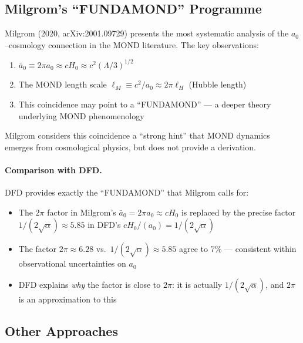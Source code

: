 \documentclass[12pt,a4paper]{article}
\newcommand{\Hzero}{H_0}
\begin{document}
\subsection{Milgrom's ``FUNDAMOND'' Programme}

Milgrom (2020, arXiv:2001.09729) presents the most systematic analysis of
the $a_0$--cosmology connection in the MOND literature. The key
observations:
\begin{enumerate}
\item $\bar{a}_0 \equiv 2\pi a_0 \approx c\Hzero \approx c^2(\Lambda/3)^{1/2}$
\item The MOND length scale $\ell_M \equiv c^2/a_0 \approx 2\pi \ell_H$
  (Hubble length)
\item This coincidence may point to a ``FUNDAMOND'' --- a deeper theory
  underlying MOND phenomenology
\end{enumerate}

Milgrom considers this coincidence a ``strong hint'' that MOND dynamics
emerges from cosmological physics, but does not provide a derivation.

\paragraph{Comparison with DFD.}
DFD provides exactly the ``FUNDAMOND'' that Milgrom calls for:
\begin{itemize}
\item The $2\pi$ factor in Milgrom's $\bar{a}_0 = 2\pi a_0 \approx c\Hzero$
  is replaced by the precise factor $1/(2\sqrt{\alpha}) \approx 5.85$ in DFD's
  $c\Hzero/(a_0) = 1/(2\sqrt{\alpha})$
\item The factor $2\pi \approx 6.28$ vs.\ $1/(2\sqrt{\alpha}) \approx 5.85$
  agree to 7\% --- consistent within observational uncertainties on $a_0$
\item DFD explains \emph{why} the factor is close to $2\pi$: it is actually
  $1/(2\sqrt{\alpha})$, and $2\pi$ is an approximation to this
\end{itemize}

\subsection{Other Approaches}
\end{document}

